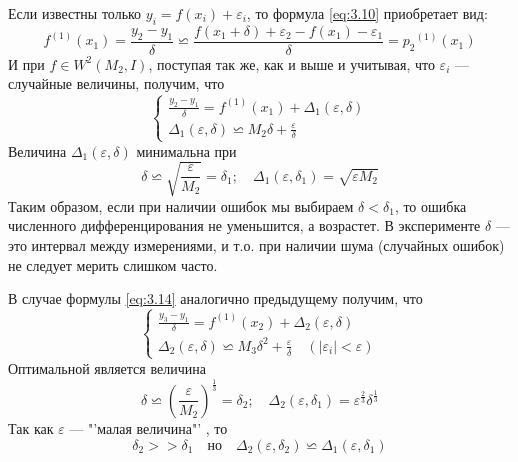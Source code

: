 Если известны только $y_i = f(x_i) + \varepsilon_i$, то формула \ref{eq:3.10} приобретает вид:
\begin{dmath}
	f^{(1)}(x_1) = \frac{y_2 - y_1}{\delta} \backsimeq \frac{f(x_1 + \delta) + \varepsilon_2 - f(x_1) - \varepsilon_1}{\delta} = {p_2}^{(1)}(x_1)
\end{dmath}
И при $f \in W^2(M_2, I)$, поступая так же, как и выше и учитывая, что $\varepsilon_i$ --- случайные величины, получим, что
\begin{dmath}
	\begin{cases}
		\frac{y_2 - y_1}{\delta} = f^{(1)}(x_1) + \Delta_1(\varepsilon, \delta) \\
		\Delta_1(\varepsilon, \delta) \backsimeq M_2\delta + \frac{\varepsilon}{\delta}
	\end{cases}
\end{dmath}
Величина $\Delta_1(\varepsilon, \delta)$ минимальна при
\begin{equation}
	\delta \backsimeq \sqrt{\frac{\varepsilon}{M_2}} = \delta_1; \quad \Delta_1(\varepsilon, \delta_1) = \sqrt{\varepsilon M_2}
\end{equation}
Таким образом, если при наличии ошибок мы выбираем $\delta<\delta_1$, то ошибка численного дифференцирования не уменьшится, а возрастет. В эксперименте $\delta$ --- это интервал между измерениями, и т.о. при наличии шума (случайных ошибок) не следует мерить слишком часто.

В случае формулы \ref{eq:3.14} аналогично предыдущему получим, что
\begin{dmath}
	\begin{cases}
		\frac{y_3 - y_1}{\delta} = f^{(1)}(x_2) + \Delta_2(\varepsilon, \delta) \\ 
		\Delta_2(\varepsilon, \delta) \backsimeq M_3\delta^2 + \frac{\varepsilon}{\delta} \quad (|\varepsilon_i|<\varepsilon)
	\end{cases}
\end{dmath}
Оптимальной является величина
\begin{equation}
	\delta \backsimeq {(\frac{\varepsilon}{M_2})}^{\frac{1}{3}} = \delta_2; \quad \Delta_2(\varepsilon, \delta_1) = \varepsilon^{\frac{2}{3}} \delta^{\frac{1}{3}}
\end{equation}
Так как $\varepsilon$ --- "'малая величина"' , то 
\begin{equation}
	\delta_2 >> \delta_1 \quad но \quad \Delta_2(\varepsilon, \delta_2) \backsimeq \Delta_1(\varepsilon, \delta_1)
\end{equation}


